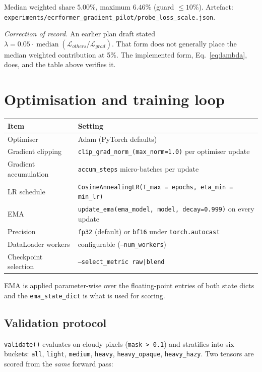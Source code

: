 \documentclass[10pt,a4paper]{article}
\newcommand{\code}[1]{\texttt{#1}}
\begin{document}
Median weighted share $5.00\%$, maximum $6.46\%$ (guard $\le 10\%$). Artefact:
\code{experiments/ecrformer\_gradient\_pilot/probe\_loss\_scale.json}.

\emph{Correction of record.} An earlier plan draft stated
$\lambda = 0.05\cdot\operatorname{median}(\mathcal{L}_{others}/\mathcal{L}_{grad})$. That form does
not generally place the median weighted contribution at 5\%. The implemented form,
Eq.~\eqref{eq:lambda}, does, and the table above verifies it.

\section{Optimisation and training loop}

\begin{center}
\begin{tabular}{@{}ll@{}}
\hline
Item & Setting \\
\hline
Optimiser & Adam (PyTorch defaults) \\
Gradient clipping & \code{clip\_grad\_norm\_(max\_norm=1.0)} per optimiser update \\
Gradient accumulation & \code{accum\_steps} micro-batches per update \\
LR schedule & \code{CosineAnnealingLR(T\_max = epochs, eta\_min = min\_lr)} \\
EMA & \code{update\_ema(ema\_model, model, decay=0.999)} on every update \\
Precision & \code{fp32} (default) or \code{bf16} under \code{torch.autocast} \\
DataLoader workers & configurable (\code{--num\_workers}) \\
Checkpoint selection & \code{--select\_metric raw|blend} \\
\hline
\end{tabular}
\end{center}

EMA is applied parameter-wise over the floating-point entries of both state dicts and the
\code{ema\_state\_dict} is what is used for scoring.

\subsection{Validation protocol}

\code{validate()} evaluates on cloudy pixels (\code{mask > 0.1}) and stratifies into six buckets:
\code{all}, \code{light}, \code{medium}, \code{heavy}, \code{heavy\_opaque}, \code{heavy\_hazy}.
Two tensors are scored from the \emph{same} forward pass:
\end{document}
